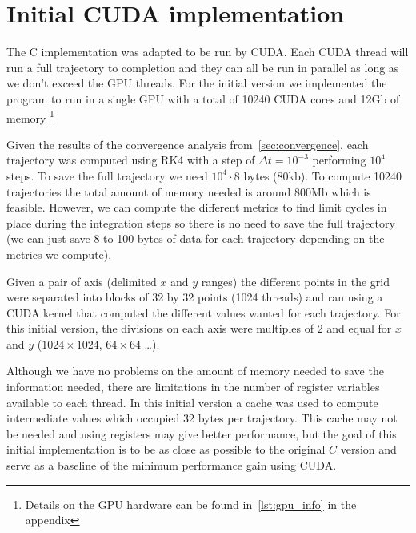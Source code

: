 
\section{Initial CUDA implementation}

The C implementation was adapted to be run by CUDA. Each CUDA thread will run a
full trajectory to completion and they can all be run in parallel as long as we
don't exceed the GPU threads. For the initial version we implemented the program
to run in a single GPU with a total of 10240 CUDA cores and 12Gb of memory
\footnote{Details on the GPU hardware can be found in~\cref{lst:gpu_info} in the appendix}

Given the results of the convergence analysis from~\cref{sec:convergence}, each
trajectory was computed using RK4 with a step of $\Delta t=10^{-3}$ performing
$10^4$ steps. To save the full trajectory we need $10^4\cdot 8$ bytes (80kb). To
compute 10240 trajectories the total amount of memory needed is around 800Mb
which is feasible. However, we can compute the different metrics to find limit
cycles in place during the integration steps so there is no need to save the
full trajectory (we can just save 8 to 100 bytes of data for each trajectory
depending on the metrics we compute).

Given a pair of axis (delimited $x$ and $y$ ranges) the different points in the
grid were separated into blocks of 32 by 32 points (1024 threads) and ran using
a CUDA kernel that computed the different values wanted for each trajectory. For
this initial version, the divisions on each axis were multiples of 2 and equal
for $x$ and $y$ ($1024\times 1024$, $64\times 64$ \dots ).

Although we have no problems on the amount of memory needed to save the
information needed, there are limitations in the number of register variables
available to each thread. In this initial version a cache was used to compute
intermediate values which occupied 32 bytes per trajectory. This cache may not
be needed and using registers may give better performance, but the goal of this
initial implementation is to be as close as possible to the original $C$ version
and serve as a baseline of the minimum performance gain using CUDA.
